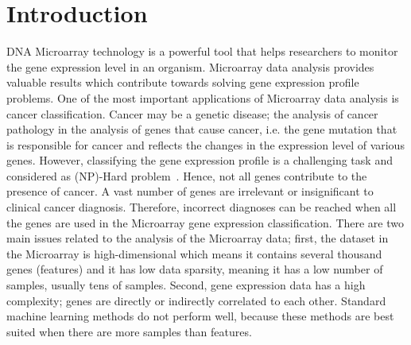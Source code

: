 \documentclass[runningheads]{llncs}
\begin{document}
\section{Introduction}

DNA Microarray technology is a powerful tool that helps researchers to monitor the gene expression level in an organism. Microarray data analysis provides valuable results which contribute towards solving gene expression profile problems. One of the most important applications of Microarray data analysis is cancer classification. Cancer may be a genetic disease; the analysis of cancer pathology in the analysis of genes that cause cancer, i.e. the gene mutation that is responsible for cancer and reflects the changes in the expression level of various genes. However, classifying the gene expression profile is a challenging task and considered as (NP)-Hard problem~\cite{narendra1977branch}. Hence, not all genes contribute to the presence of cancer. A vast number of genes are irrelevant or insignificant to clinical cancer diagnosis. Therefore, incorrect diagnoses can be reached when all the genes are used in the Microarray gene expression classification. There are two main issues related to the analysis of the Microarray data; first, the dataset in the Microarray is high-dimensional which means it contains several thousand genes (features) and it has low data sparsity, meaning it has a low number of samples, usually tens of samples. Second, gene expression data has a high complexity; genes are directly or indirectly correlated to each other. Standard machine learning methods do not perform well, because these methods are best suited when there are more samples than features.
\end{document}
